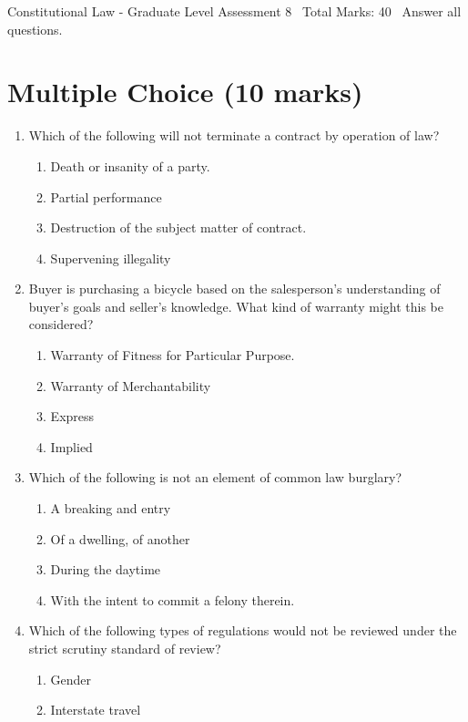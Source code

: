 \documentclass[12pt]{article}
\begin{document}
\begin{center}
Constitutional Law - Graduate Level Assessment 8 \
Total Marks: 40 \
Answer all questions.
\end{center}

\section*{Multiple Choice (10 marks)}
\begin{enumerate}[label=\arabic*.]
\item Which of the following will not terminate a contract by operation of law?
\begin{enumerate}[label=(\alph*)]
    \item Death or insanity of a party.
    \item Partial performance
    \item Destruction of the subject matter of contract.
    \item Supervening illegality
\end{enumerate}
\item Buyer is purchasing a bicycle based on the salesperson's understanding of buyer's goals and seller's knowledge. What kind of warranty might this be considered?
\begin{enumerate}[label=(\alph*)]
    \item Warranty of Fitness for Particular Purpose.
    \item Warranty of Merchantability
    \item Express
    \item Implied
\end{enumerate}
\item Which of the following is not an element of common law burglary?
\begin{enumerate}[label=(\alph*)]
    \item A breaking and entry
    \item Of a dwelling, of another
    \item During the daytime
    \item With the intent to commit a felony therein.
\end{enumerate}
\item Which of the following types of regulations would not be reviewed under the strict scrutiny standard of review?
\begin{enumerate}[label=(\alph*)]
    \item Gender
    \item Interstate travel

\end{enumerate}
\end{enumerate}
\end{document}
